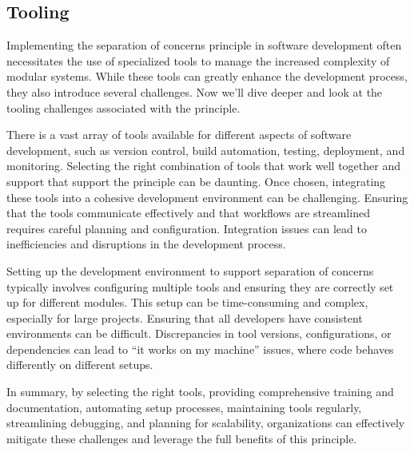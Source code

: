 \subsection{Tooling}
Implementing the separation of concerns principle in software development often necessitates the use of specialized tools to manage the increased complexity of modular systems. While these tools can greatly enhance the development process, they also introduce several challenges. Now we'll dive deeper and look at the tooling challenges associated with the principle.
\par
There is a vast array of tools available for different aspects of software development, such as version control, build automation, testing, deployment, and monitoring. Selecting the right combination of tools that work well together and support that support the principle can be daunting.
Once chosen, integrating these tools into a cohesive development environment can be challenging. Ensuring that the tools communicate effectively and that workflows are streamlined requires careful planning and configuration. Integration issues can lead to inefficiencies and disruptions in the development process.
\par
Setting up the development environment to support separation of concerns typically involves configuring multiple tools and ensuring they are correctly set up for different modules. This setup can be time-consuming and complex, especially for large projects.
Ensuring that all developers have consistent environments can be difficult. Discrepancies in tool versions, configurations, or dependencies can lead to “it works on my machine” issues, where code behaves differently on different setups.
\par
In summary, by selecting the right tools, providing comprehensive training and documentation, automating setup processes, maintaining tools regularly, streamlining debugging, and planning for scalability, organizations can effectively mitigate these challenges and leverage the full benefits of this principle.


